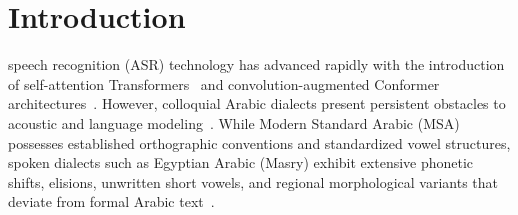 \documentclass[journal]{IEEEtran}
\begin{document}
\section{Introduction}
 speech recognition (ASR) technology has advanced rapidly with the introduction of self-attention Transformers~\cite{vaswani2017attention} and convolution-augmented Conformer architectures~\cite{gulati2020conformer}. However, colloquial Arabic dialects present persistent obstacles to acoustic and language modeling~\cite{biadsy2009phonological,habash2010introduction}. While Modern Standard Arabic (MSA) possesses established orthographic conventions and standardized vowel structures, spoken dialects such as Egyptian Arabic (Masry) exhibit extensive phonetic shifts, elisions, unwritten short vowels, and regional morphological variants that deviate from formal Arabic text~\cite{billa2019cross,alhaj2018acoustic}.
\end{document}
